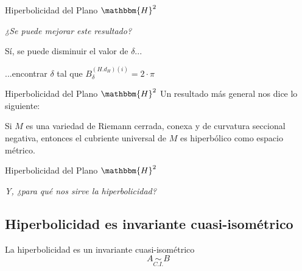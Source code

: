 \documentclass[xcolor=dvipsnames,aspectratio=159]{beamer}
\theoremstyle{largebreak}
\newcommand{\bbm}[1]{\ensuremath{\mathbbm{#1}}}
\newcommand{\qisom}{\ensuremath{\underset{C.I.}{\sim}}}
\begin{document}
\begin{frame}{Hiperbolicidad del Plano $\bbm{H}^2$}

    \begin{center}
        \Large\textit{¿Se puede mejorar este resultado?}

        \pause

        \hfill\break
        
        Sí, se puede disminuir el valor de $\delta$...
    \end{center}

    \begin{center}
        ...encontrar $\delta$ tal que $B_{\delta}^{(H.d_H)(i)}=2\cdot\pi$
    \end{center}

\end{frame}

\begin{frame}{Hiperbolicidad del Plano $\bbm{H}^2$}
    Un resultado más general nos dice lo siguiente:
    \pause
    \begin{theor}
        Si $M$ es una variedad de Riemann cerrada, conexa y de curvatura seccional negativa, entonces el cubriente universal de $M$ es hiperbólico como espacio métrico.
    \end{theor}

\end{frame}

\begin{frame}{Hiperbolicidad del Plano $\bbm{H}^2$}
    \begin{center}
        \Large\textit{Y, ¿para qué nos sirve la hiperbolicidad?}
    \end{center}
\end{frame}

\subsection{Hiperbolicidad es invariante cuasi-isométrico}

\begin{frame}
    \begin{center}
        \Large La hiperbolicidad es un invariante cuasi-isométrico
        \pause
        \Huge
        \begin{equation*}
            A \qisom B
        \end{equation*}
    \end{center}
\end{frame}
\end{document}

